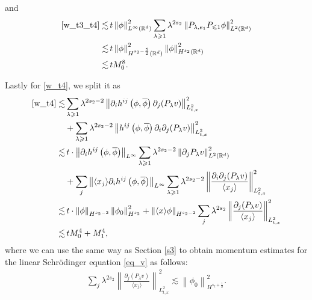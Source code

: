 \documentclass[10pt,twoside,a4paper]{article}
\numberwithin{equation}{section}\allowdisplaybreaks
\def\leq{\leqslant}
\def\geq{\geqslant}
\begin{document}
	and
	\begin{align*}
		\eqref{w_t3_t4} \lesssim &\,t\left\|  \phi \right\|_{L^{\infty}(\mathbb{R}^d)}^2  \sum_{\lambda \geq 1} \lambda^{ 2s_2}\left\|  P_{\lambda,e_1} P_{\leq 1}  \phi\right\|_{L^{2}(\mathbb{R}^d)}^2  \\
		\lesssim &\,t\left\|  \phi \right\|_{H^{s_2-\frac 52}(\mathbb{R}^d)}^2   \left\|    \phi\right\|_{H^{s_2}(\mathbb{R}^d)}^2 \\
		\lesssim&\, t M_0^8.
	\end{align*}
	
	Lastly for \eqref{w_t4}, we split it as
	\begin{align*}
		\eqref{w_t4}	\lesssim &\sum_{\lambda \geq 1} \lambda^{ 2s_2-2}
		\left\|\partial_i h^{ij}\left(\phi,\overline{\phi}\right)   \partial_j  (P_{\lambda }  v) \right\|_{L^2_{t,x}}^2\\
		&+\sum_{\lambda \geq 1} \lambda^{ 2s_2-2}
		\left\| h^{ij}\left(\phi,\overline{\phi}\right)   \partial_i\partial_j  (P_{\lambda }  v) \right\|_{L^2_{t,x}}^2\\
		\lesssim &  \,t \cdot  \left\|   \partial_i h^{ij}\left(\phi,\overline{\phi}\right) \right\|_{L^\infty}   \sum_{\lambda \geq 1} \lambda^{ 2s_2-2}
		\left\|  \partial_j   P_{\lambda }  v   \right\|_{L^2 (\mathbb{R}^d)}^2\\
		&+  \sum_j  \left\| \langle x_j \rangle  \partial_i h^{ij}\left(\phi,\overline{\phi}\right) \right\|_{L^\infty}   \sum_{\lambda \geq 1} \lambda^{ 2s_2-2}
		\left\|  \frac { \partial_i\partial_j  (P_{\lambda }  v) }{\langle x_j \rangle }\right\|_{L^2_{t,x}}^2\\
		\lesssim & \, t \cdot  \left\|    \phi  \right\|_{H^{s_2-2}}   
		\left\|  \phi_0   \right\|_{H^{s_2} }^2 +\left\|  \langle x  \rangle \phi \right\|_{H^{s_2-2}}  \sum_j   \lambda^{ 2s_2} 	\left\|  \frac { \partial_j  (P_{\lambda }  v) }{\langle x_j \rangle }\right\|_{L^2_{t,x}}^2 \\
		\lesssim &  \,tM_0^4 +  M_1^4,
	\end{align*}
	where we can use the same way as Section \ref{s3} to obtain momentum estimates for the linear Schr\"odinger equation \eqref{eq_v} as follows:
	\begin{align*}
		\sum_j   \lambda^{ 2s_2} 	\left\|  \frac { \partial_j  (P_{\lambda }  v) }{\langle x_j \rangle }\right\|_{L^2_{t,x}}^2 \lesssim \left\| \phi_0\right\|_{H^{s_2+\frac 12}}^2.
	\end{align*}
	
	
	
\end{document}
